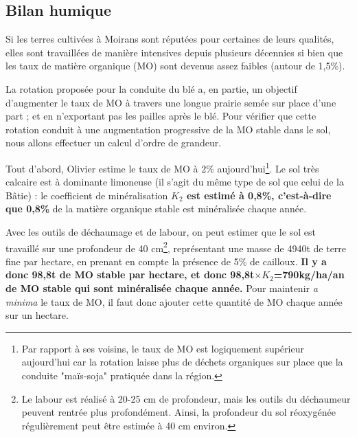 \documentclass{article}
\begin{document}
\subsection{Bilan humique}

Si les terres cultivées à Moirans sont réputées pour certaines de leurs qualités, elles sont travaillées de manière intensives depuis plusieurs décennies si bien que les taux de matière organique (MO) sont devenus assez faibles (autour de 1,5\%). 

La rotation proposée pour la conduite du blé a, en partie, un objectif d'augmenter le taux de MO à travers une longue prairie semée sur place d'une part ; et en n'exportant pas les pailles après le blé. Pour vérifier que cette rotation conduit à une augmentation progressive de la MO stable dans le sol, nous allons effectuer un calcul d'ordre de grandeur.

Tout d'abord, Olivier estime le taux de MO à 2\% aujourd'hui\footnote{Par rapport à ses voisins, le taux de MO est logiquement supérieur aujourd'hui car la rotation laisse plus de déchets organiques sur place que la conduite "maïs-soja" pratiquée dans la région.}. Le sol très calcaire est à dominante limoneuse (il s'agit du même type de sol que celui de la Bâtie) : le coefficient de minéralisation\textbf{ $K_2$ est estimé à 0,8\%, c'est-à-dire que 0,8\%} de la matière organique stable est minéralisée chaque année. 

Avec les outils de déchaumage et de labour, on peut estimer que le sol est travaillé sur une profondeur de 40 cm\footnote{Le labour est réalisé à 20-25 cm de profondeur, mais les outils du déchaumeur peuvent rentrée plus profondément. Ainsi, la profondeur du sol réoxygénée régulièrement peut être estimée à 40 cm environ.}, représentant une masse de 4940t de terre fine par hectare, en prenant en compte la présence de 5\% de cailloux. \textbf{Il y a donc 98,8t de MO stable par hectare, et donc 98,8t$\times K_2$=790kg/ha/an de MO stable qui sont minéralisée chaque année.} Pour maintenir \textit{a minima} le taux de MO, il faut donc ajouter cette quantité de MO chaque année sur un hectare. 
\end{document}
